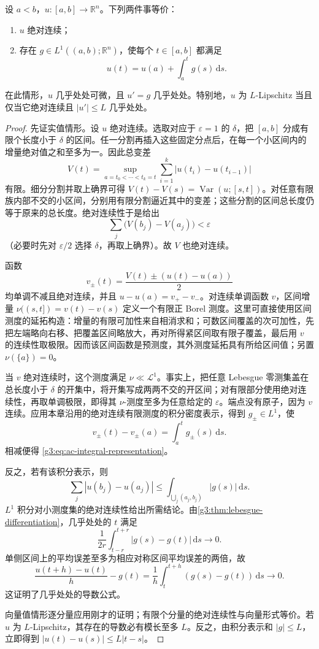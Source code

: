 \begin{theorem}[绝对连续函数的微积分基本定理]\label{g3:thm:ac-fundamental-calculus}
	设 \(a<b\)，\(u:[a,b]\to\mathbb R^n\)。下列两件事等价：
	\begin{enumerate}
		\item \(u\) 绝对连续；
		\item 存在 \(g\in L^1((a,b);\mathbb R^n)\)，使每个 \(t\in[a,b]\) 都满足
		\begin{equation}\label{g3:eq:ac-integral-representation}
			u(t)=u(a)+\int_a^t g(s)\,\mathrm ds.
		\end{equation}
	\end{enumerate}
	在此情形，\(u\) 几乎处处可微，且 \(u'=g\) 几乎处处。特别地，\(u\) 为 \(L\)-Lipschitz 当且仅当它绝对连续且 \(|u'|\le L\) 几乎处处。
\end{theorem}
\begin{proof}
	先证实值情形。设 \(u\) 绝对连续。选取对应于 \(\varepsilon=1\) 的 \(\delta\)，把 \([a,b]\) 分成有限个长度小于 \(\delta\) 的区间。任一分割再插入这些固定分点后，在每一个小区间内的增量绝对值之和至多为一。因此总变差
	\[
		V(t)=\sup_{a=t_0<\cdots<t_k=t}
		\sum_{i=1}^k|u(t_i)-u(t_{i-1})|
	\]
	有限。细分分割并取上确界可得
	\(V(t)-V(s)=\operatorname{Var}(u;[s,t])\)。对任意有限族内部不交的小区间，分别用有限分割逼近其中的变差；这些分割的区间总长度仍等于原来的总长度。绝对连续性于是给出
	\[
		\sum_j\bigl(V(b_j)-V(a_j)\bigr)<\varepsilon
	\]
	（必要时先对 \(\varepsilon/2\) 选择 \(\delta\)，再取上确界）。故 \(V\) 也绝对连续。

	函数
	\[
		v_\pm(t)=\frac{V(t)\pm(u(t)-u(a))}{2}
	\]
	均单调不减且绝对连续，并且 \(u-u(a)=v_+-v_-\)。对连续单调函数 \(v\)，区间增量
	\(\nu((s,t])=v(t)-v(s)\) 定义一个有限正 Borel 测度。这里可直接使用区间测度的延拓构造：增量的有限可加性来自相消求和；可数区间覆盖的次可加性，先把左端略向右移、把覆盖区间略放大，再对所得紧区间取有限子覆盖，最后用 \(v\) 的连续性取极限。因而该区间函数是预测度，其外测度延拓具有所给区间值；另置 \(\nu(\{a\})=0\)。

	当 \(v\) 绝对连续时，这个测度满足 \(\nu\ll\mathcal L^1\)。事实上，把任意 Lebesgue 零测集盖在总长度小于 \(\delta\) 的开集中，将开集写成两两不交的开区间；对有限部分使用绝对连续性，再取单调极限，即得其 \(\nu\)-测度至多为任意给定的 \(\varepsilon\)。端点没有原子，因为 \(v\) 连续。应用本章沿用的绝对连续有限测度的积分密度表示，得到 \(g_\pm\in L^1\)，使
	\[
		v_\pm(t)-v_\pm(a)=\int_a^t g_\pm(s)\,\mathrm ds.
	\]
	相减便得 \eqref{g3:eq:ac-integral-representation}。

	反之，若有该积分表示，则
	\[
		\sum_j|u(b_j)-u(a_j)|
		\le\int_{\bigcup_j(a_j,b_j)}|g(s)|\,\mathrm ds.
	\]
	\(L^1\) 积分对小测度集的绝对连续性给出所需结论。由\cref{g3:thm:lebesgue-differentiation}，几乎处处的 \(t\) 满足
	\[
		\frac1{2r}\int_{t-r}^{t+r}|g(s)-g(t)|\,\mathrm ds\longrightarrow0.
	\]
	单侧区间上的平均误差至多为相应对称区间平均误差的两倍，故
	\[
		\frac{u(t+h)-u(t)}h-g(t)
		=\frac1h\int_t^{t+h}(g(s)-g(t))\,\mathrm ds\longrightarrow0.
	\]
	这证明了几乎处处的导数公式。

	向量值情形逐分量应用刚才的证明；有限个分量的绝对连续性与向量形式等价。若 \(u\) 为 \(L\)-Lipschitz，其存在的导数必有模长至多 \(L\)。反之，由积分表示和 \(|g|\le L\)，立即得到 \(|u(t)-u(s)|\le L|t-s|\)。
\end{proof}

